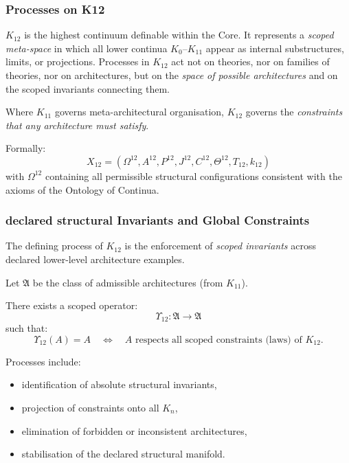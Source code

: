 

\subsubsection{Processes on K12}
\label{sec:processes-k12}

$K_{12}$ is the highest continuum definable within the Core.
It represents a \emph{scoped meta-space} in which all lower continua
$K_0$--$K_{11}$ appear as internal substructures, limits, or projections.
Processes in $K_{12}$ act not on theories, nor on families of theories,
nor on architectures, but on the \emph{space of possible architectures}
and on the scoped invariants connecting them.

Where $K_{11}$ governs meta-architectural organisation,
$K_{12}$ governs the \emph{constraints that any architecture must satisfy}.

Formally:
\[
X_{12} = (\Omega^{12}, A^{12}, P^{12}, J^{12},
          C^{12}, \Theta^{12}, T_{12}, k_{12})
\]
with $\Omega^{12}$ containing all permissible structural configurations
consistent with the axioms of the Ontology of Continua.

\subsubsection{declared structural Invariants and Global Constraints}

The defining process of $K_{12}$ is the enforcement of
\emph{scoped invariants} across declared lower-level architecture examples.

Let $\mathfrak{A}$ be the class of admissible architectures
(from $K_{11}$).

There exists a scoped operator:
\[
\Upsilon_{12} : \mathfrak{A} \to \mathfrak{A}
\]
such that:
\[
\Upsilon_{12}(A) = A
\quad \Longleftrightarrow \quad
A \text{ respects all scoped constraints (laws) of } K_{12}.
\]

Processes include:
\begin{itemize}
    \item identification of absolute structural invariants,
    \item projection of constraints onto all $K_n$,
    \item elimination of forbidden or inconsistent architectures,
    \item stabilisation of the declared structural manifold.
\end{itemize}

